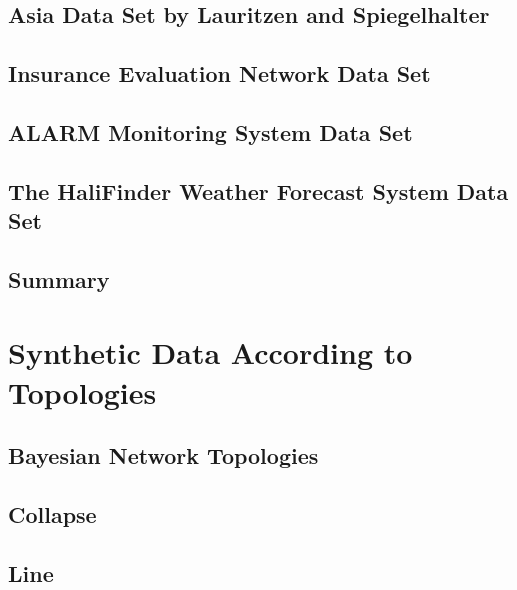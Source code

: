 \documentclass[12pt,a4paper,oneside]{book}
\theoremstyle{plain}
\theoremstyle{definition}
\theoremstyle{remark}
\theoremstyle{definition}
\numberwithin{equation}{chapter}
\begin{document}
\subsection{Asia Data Set by Lauritzen and Spiegelhalter}


\newpage{}

\subsection{Insurance Evaluation Network Data Set}


\newpage{}

\subsection{ALARM Monitoring System Data Set}


\newpage{}

\subsection{The HaliFinder Weather Forecast System Data Set}


\newpage{}

\subsection{Summary}


\newpage{}

\section{Synthetic Data According to Topologies}

\subsection{Bayesian Network Topologies}


\newpage{}

\subsection{Collapse}


\newpage{}

\subsection{Line}

\end{document}
